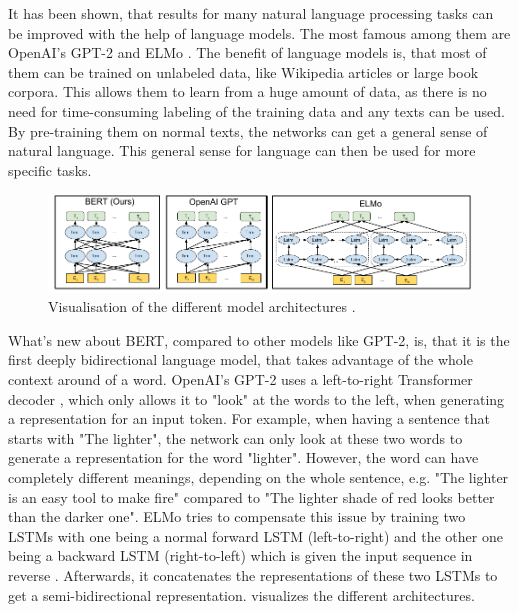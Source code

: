 It has been shown, that results for many natural language processing tasks can be improved with the help of language models.
The most famous among them are OpenAI's GPT-2 \cite{radford2019language} and ELMo \cite{1802.05365}.
The benefit of language models is, that most of them can be trained on unlabeled data, like Wikipedia articles or large book corpora.
This allows them to learn from a huge amount of data, as there is no need for time-consuming labeling of the training data and any texts can be used.
By pre-training them on normal texts, the networks can get a general sense of natural language.
This general sense for language can then be used for more specific tasks.

\begin{figure}[h]
\centering
\includegraphics[width=0.7\paperwidth]{figures/bert-gpt2-elmo-model-comparison}
\caption[Visualisation of the different model architectures]{Visualisation of the different model architectures \cite[p.~13]{devlin2018bert}.}
\label{fig:bert-gpt2-elmo-model-comparison}
\end{figure}

What's new about BERT, compared to other models like GPT-2, is, that it is the first deeply bidirectional language model, that takes advantage of the whole context around of a word.
OpenAI's GPT-2 uses a left-to-right Transformer decoder \cite[p.~4]{radford2019language}, which only allows it to "look" at the words to the left, when generating a representation for an input token.
For example, when having a sentence that starts with "The lighter", the network can only look at these two words to generate a representation for the word "lighter".
However, the word can have completely different meanings, depending on the whole sentence, e.g. "The lighter is an easy tool to make fire" compared to "The lighter shade of red looks better than the darker one". 
ELMo tries to compensate this issue by training two LSTMs with one being a normal forward LSTM (left-to-right) and the other one being a backward LSTM (right-to-left) which is given the input sequence in reverse \cite[p.~2--3]{1802.05365}.
Afterwards, it concatenates the representations of these two LSTMs to get a semi-bidirectional representation.
 visualizes the different architectures.

